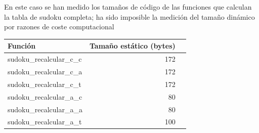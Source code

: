 \documentclass[12pt,letterpaper]{article}
\begin{document}
\begin{itemize}
\begin{center}
\begin{tabular}{ l | r | r }
    \end{tabular}
  \end{center}
  En este caso se han medido los tamaños de c\'odigo de las funciones
  que calculan la tabla de sudoku completa; ha sido imposible la
  medici\'on del tamaño din\'amico por razones de coste computacional
  \begin{center}
    \begin{tabular}{ l | r | r }
      Funci\'on                                   & Tamaño est\'atico (bytes) \\ \hline
      sudoku\_recalcular\_c\_c                  & 172                       \\
      sudoku\_recalcular\_c\_a                  & 172                       \\
      sudoku\_recalcular\_c\_t \footnotemark[1] & 172                       \\
      sudoku\_recalcular\_a\_c                  & 80                        \\
      sudoku\_recalcular\_a\_a                  & 80                        \\
      sudoku\_recalcular\_a\_t                  & 100                       \\
    \end{tabular}
  \end{center}
\end{itemize}

\end{document}
